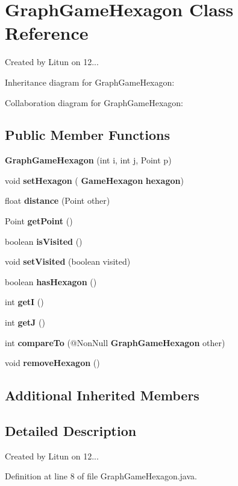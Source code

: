 \section{Graph\+Game\+Hexagon Class Reference}
\label{classru_1_1litun_1_1unitingtwist_1_1_graph_game_hexagon}


Created by Litun on 12...  




Inheritance diagram for Graph\+Game\+Hexagon\+:


Collaboration diagram for Graph\+Game\+Hexagon\+:
\subsection*{Public Member Functions}
\begin{DoxyCompactItemize}
\item 
\textbf{ Graph\+Game\+Hexagon} (int i, int j, Point p)
\item 
void \textbf{ set\+Hexagon} (\textbf{ Game\+Hexagon} \textbf{ hexagon})
\item 
float \textbf{ distance} (Point other)
\item 
Point \textbf{ get\+Point} ()
\item 
boolean \textbf{ is\+Visited} ()
\item 
void \textbf{ set\+Visited} (boolean visited)
\item 
boolean \textbf{ has\+Hexagon} ()
\item 
int \textbf{ getI} ()
\item 
int \textbf{ getJ} ()
\item 
int \textbf{ compare\+To} (@Non\+Null \textbf{ Graph\+Game\+Hexagon} other)
\item 
void \textbf{ remove\+Hexagon} ()
\end{DoxyCompactItemize}
\subsection*{Additional Inherited Members}


\subsection{Detailed Description}
Created by Litun on 12... 

Definition at line 8 of file Graph\+Game\+Hexagon.\+java.



